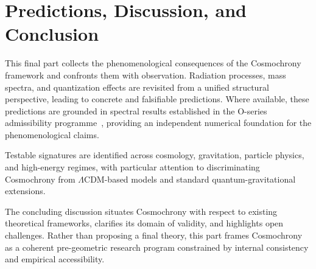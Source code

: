 \clearpage

\part{Predictions, Discussion, and Conclusion}
  \label{part:predictions-discussion-and-conclusion}

  This final part collects the phenomenological consequences of the Cosmochrony framework and
  confronts them with observation.
  Radiation processes, mass spectra, and quantization effects are revisited from a unified
  structural perspective, leading to concrete and falsifiable predictions.
  Where available, these predictions are grounded in spectral results established in the
  O-series admissibility programme~\cite{Beau2026a1,Beau2026a31}, providing an independent
  numerical foundation for the phenomenological claims.

  Testable signatures are identified across cosmology, gravitation, particle physics, and
  high-energy regimes, with particular attention to discriminating Cosmochrony from
  $\Lambda$CDM-based models and standard quantum-gravitational extensions.

  The concluding discussion situates Cosmochrony with respect to existing theoretical
  frameworks, clarifies its domain of validity, and highlights open challenges.
  Rather than proposing a final theory, this part frames Cosmochrony as a coherent
  pre-geometric research program constrained by internal consistency and empirical
  accessibility.

  \clearpage
  
  
  
  
  
